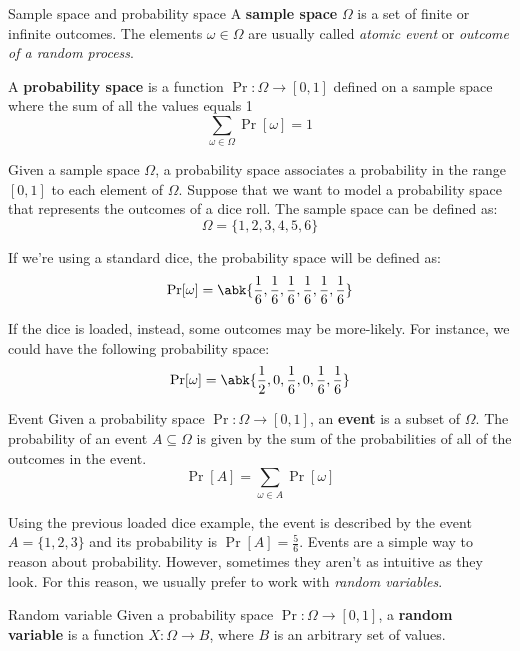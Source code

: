 \documentclass[a4paper, 12pt]{report}
\begin{document}
    \begin{frameddefn}{Sample space and probability space}
        A \textbf{sample space} $\Omega$ is a set of finite or infinite outcomes. The elements $\omega \in \Omega$ are usually called \textit{atomic event} or \textit{outcome of a random process}.

        A \textbf{probability space} is a function $\Pr : \Omega \to [0,1]$ defined on a sample space where the sum of all the values equals 1
        \[\sum_{\omega \in \Omega} \Pr[\omega] = 1\]
    \end{frameddefn}

    Given a sample space $\Omega$, a probability space associates a probability in the range $[0,1]$ to each element of $\Omega$. Suppose that we want to model a probability space that represents the outcomes of a dice roll. The sample space can be defined as:
    \[\Omega = \{1,2,3,4,5,6\}\]

    If we're using a standard dice, the probability space will be defined as:
    \[\Pr[\omega] = \abk{\frac{1}{6}, \frac{1}{6}, \frac{1}{6}, \frac{1}{6}, \frac{1}{6}, \frac{1}{6}}\]

    If the dice is loaded, instead, some outcomes may be more-likely. For instance, we could have the following probability space:
    \[\Pr[\omega] = \abk{\frac{1}{2}, 0, \frac{1}{6}, 0, \frac{1}{6}, \frac{1}{6}}\]

    \begin{frameddefn}{Event}
        Given a probability space $\Pr : \Omega \to [0,1]$, an \textbf{event} is a subset of $\Omega$. The probability of an event $A \subseteq \Omega$ is given by the sum of the probabilities of all of the outcomes in the event.
        \[\Pr[A] = \sum_{\omega \in A} \Pr[\omega]\]
    \end{frameddefn}

    Using the previous loaded dice example, the event  is described by the event $A = \{1,2,3\}$ and its probability is $\Pr[A] = \frac{5}{6}$. Events are a simple way to reason about probability. However, sometimes they aren't as intuitive as they look. For this reason, we usually prefer to work with \textit{random variables}.

    \begin{frameddefn}{Random variable}
        Given a probability space $\Pr : \Omega \to [0,1]$, a \textbf{random variable} is a function $X : \Omega \to B$, where $B$ is an arbitrary set of values.
    \end{frameddefn}
\end{document}

